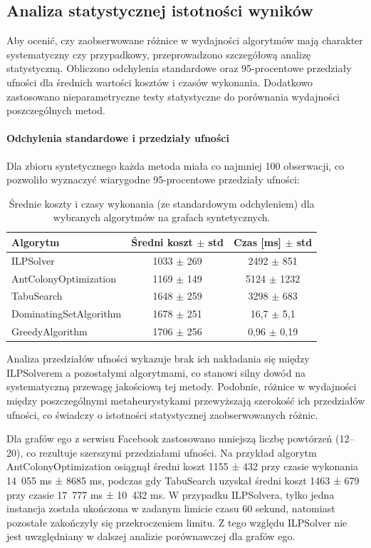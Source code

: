 \subsection{Analiza statystycznej istotności wyników}

Aby ocenić, czy zaobserwowane różnice w wydajności algorytmów mają charakter systematyczny czy przypadkowy, przeprowadzono szczegółową analizę statystyczną. Obliczono odchylenia standardowe oraz 95-procentowe przedziały ufności dla średnich wartości kosztów i czasów wykonania. Dodatkowo zastosowano nieparametryczne testy statystyczne do porównania wydajności poszczególnych metod.

\paragraph{Odchylenia standardowe i przedziały ufności}

Dla zbioru syntetycznego każda metoda miała co najmniej 100 obserwacji, co pozwoliło wyznaczyć wiarygodne 95-procentowe przedziały ufności:

\begin{table}[H]
\caption{Średnie koszty i czasy wykonania (ze standardowym odchyleniem) dla wybranych algorytmów na grafach syntetycznych.}
\label{tab:synthetic_alg_performance}
\centering
\begin{tabular}{lcc}
\toprule
\textbf{Algorytm} & \textbf{Średni koszt $\pm$ std} & \textbf{Czas [ms] $\pm$ std} \\
\midrule
ILPSolver & 1033 $\pm$ 269 & 2492 $\pm$ 851 \\
AntColonyOptimization & 1169 $\pm$ 149 & 5124 $\pm$ 1232 \\
TabuSearch & 1648 $\pm$ 259 & 3298 $\pm$ 683 \\
DominatingSetAlgorithm & 1678 $\pm$ 251 & 16,7 $\pm$ 5,1 \\
GreedyAlgorithm & 1706 $\pm$ 256 & 0,96 $\pm$ 0,19 \\
\bottomrule
\end{tabular}
\end{table}

Analiza przedziałów ufności wykazuje brak ich nakładania się między ILPSolverem a pozostałymi algorytmami, co stanowi silny dowód na systematyczną przewagę jakościową tej metody. Podobnie, różnice w wydajności między poszczególnymi metaheurystykami przewyższają szerokość ich przedziałów ufności, co świadczy o istotności statystycznej zaobserwowanych różnic.

Dla grafów ego z serwisu Facebook zastosowano mniejszą liczbę powtórzeń (12--20), co rezultuje szerszymi przedziałami ufności. Na przykład algorytm AntColonyOptimization osiągnął średni koszt 1155 ± 432 przy czasie wykonania 14~055 ms ± 8685 ms, podczas gdy TabuSearch uzyskał średni koszt 1463 ± 679 przy czasie 17~777 ms ± 10~432 ms. W przypadku ILPSolvera, tylko jedna instancja została ukończona w zadanym limicie czasu 60 sekund, natomiast pozostałe zakończyły się przekroczeniem limitu. Z tego względu ILPSolver nie jest uwzględniany w dalszej analizie porównawczej dla grafów ego.


